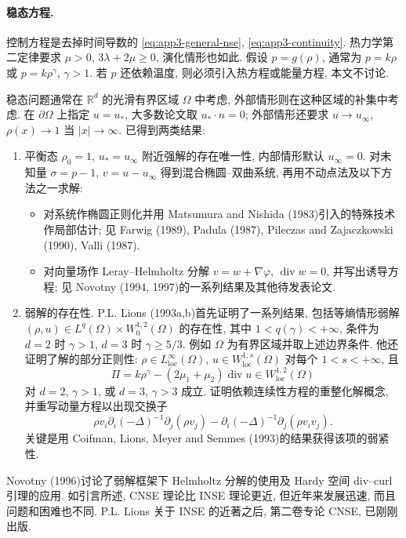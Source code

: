 \paragraph{稳态方程.}
控制方程是去掉时间导数的 
\eqref{eq:app3-general-nse}, 
\eqref{eq:app3-continuity}. 热力学第二定律要求 $\mu>0$, $3\lambda+2\mu\geq0$, 演化情形也如此. 假设 $p=g(\rho)$, 通常为 $p=k\rho$ 或 $p=k\rho^\gamma$, $\gamma>1$. 若 $p$ 还依赖温度, 则必须引入热方程或能量方程, 本文不讨论.

稳态问题通常在 $\mathbb R^d$ 的光滑有界区域 $\Omega$ 中考虑, 外部情形则在这种区域的补集中考虑. 在 $\partial\Omega$ 上指定 $u=u_*$, 大多数论文取 $u_*\cdot n=0$; 外部情形还要求 $u\to u_\infty$, $\rho(x)\to1$ 当 $|x|\to\infty$. 已得到两类结果:
\begin{enumerate}
\item 平衡态 $\rho_0=1$, $u_*=u_\infty$ 附近强解的存在唯一性, 内部情形默认 $u_\infty=0$. 对未知量 $\sigma=p-1$, $v=u-u_\infty$ 得到混合椭圆--双曲系统, 再用不动点法及以下方法之一求解:
  \begin{itemize}
  \item 对系统作椭圆正则化并用 Matsumura and Nishida (1983)引入的特殊技术作局部估计; 见 Farwig (1989), Padula (1987), Pileczas and Zajaczkowski (1990), Valli (1987).
  \item 对向量场作 Leray--Helmholtz 分解 $v=w+\nabla\varphi$, $\operatorname{div}w=0$, 并写出诱导方程; 见 Novotny (1994, 1997)的一系列结果及其他待发表论文.
  \end{itemize}
\item 弱解的存在性. P.L. Lions (1993a,b)首先证明了一系列结果, 包括等熵情形弱解 $(\rho,u)\in L^q(\Omega)\times W_0^{1,2}(\Omega)$ 的存在性, 其中 $1<q(\gamma)<+\infty$, 条件为 $d=2$ 时 $\gamma>1$, $d=3$ 时 $\gamma\geq5/3$. 例如 $\Omega$ 为有界区域并取上述边界条件. 他还证明了解的部分正则性: $\rho\in L_{\mathrm{loc}}^\infty(\Omega)$, $u\in W_{\mathrm{loc}}^{1,s}(\Omega)$ 对每个 $1<s<+\infty$, 且
\[
\Pi=k\rho^\gamma-(2\mu_1+\mu_2)\operatorname{div}u
\in W_{\mathrm{loc}}^{1,2}(\Omega)
\]
对 $d=2$, $\gamma>1$, 或 $d=3$, $\gamma>3$ 成立. 证明依赖连续性方程的重整化解概念, 并重写动量方程以出现交换子
\[
\rho v_i\partial_i(-\Delta)^{-1}\partial_j(\rho v_j)
-\partial_i(-\Delta)^{-1}\partial_j(\rho v_iv_j).
\]
关键是用 Coifman, Lions, Meyer and Semmes (1993)的结果获得该项的弱紧性.
\end{enumerate}

\hypertarget{appendix-03-page-370}{}
Novotny (1996)讨论了弱解框架下 Helmholtz 分解的使用及 Hardy 空间 div--curl 引理的应用. 如引言所述, CNSE 理论比 INSE 理论更近, 但近年来发展迅速, 而且问题和困难也不同. P.L. Lions 关于 INSE 的近著之后, 第二卷专论 CNSE, 已刚刚出版.


